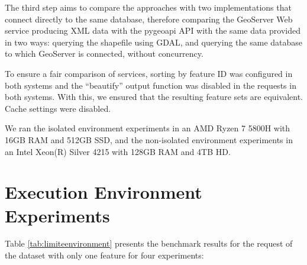 The third step aims to compare the approaches with two implementations that connect directly to the same database, therefore comparing the GeoServer Web service producing XML data with the pygeoapi API with the same data provided in two ways: querying the shapefile using GDAL, and querying the same database to which GeoServer is connected, without concurrency.

To ensure a fair comparison of services, sorting by feature ID was configured in both systems and the ``beautify'' output function was disabled in the requests in both systems. With this, we ensured that the resulting feature sets are equivalent. Cache settings were disabled.

We ran the isolated environment experiments in an AMD Ryzen 7 5800H with 16GB RAM and 512GB SSD, and the non-isolated environment experiments in an Intel Xeon(R) Silver 4215 with 128GB RAM and 4TB HD.

\section{Execution Environment Experiments}

Table \ref{tab:limiteenvironment} presents the benchmark results for the request of the dataset with only one feature for four experiments:

